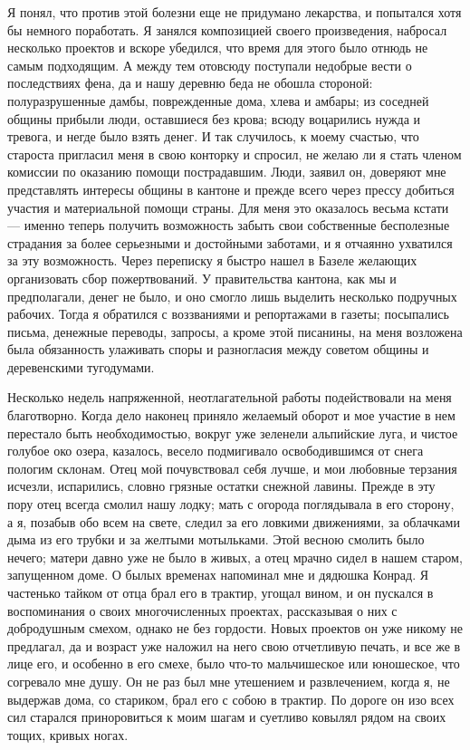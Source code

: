 Я  понял,  что против  этой  болезни  еще  не придумано  лекарства,  и
попытался  хотя бы  немного поработать.  Я занялся  композицией своего
произведения, набросал несколько проектов и вскоре убедился, что время
для  этого было  отнюдь  не  самым подходящим.  А  между тем  отовсюду
поступали недобрые вести  о последствиях фена, да и  нашу деревню беда
не обошла стороной: полуразрушенные  дамбы, поврежденные дома, хлева и
амбары; из соседней  общины прибыли люди, оставшиеся  без крова; всюду
воцарились нужда и тревога, и негде было взять денег. И так случилось,
к  моему  счастью, что  староста  пригласил  меня  в свою  конторку  и
спросил,  не желаю  ли  я  стать членом  комиссии  по оказанию  помощи
пострадавшим.  Люди, заявил  он,  доверяют  мне представлять  интересы
общины  в кантоне  и  прежде  всего через  прессу  добиться участия  и
материальной помощи страны.  Для меня это оказалось  весьма кстати ---
именно теперь получить возможность забыть свои собственные бесполезные
страдания  за более  серьезными и  достойными заботами,  и я  отчаянно
ухватился за эту возможность. Через  переписку я быстро нашел в Базеле
желающих организовать сбор пожертвований. У правительства кантона, как
мы и предполагали, денег не было, и оно смогло лишь выделить несколько
подручных рабочих.  Тогда я  обратился с  воззваниями и  репортажами в
газеты; посыпались  письма, денежные  переводы, запросы, а  кроме этой
писанины,  на  меня  возложена  была  обязанность  улаживать  споры  и
разногласия между советом общины и деревенскими тугодумами.

Несколько  недель  напряженной, неотлагательной  работы  подействовали
на  меня  благотворно.  Когда  дело наконец  приняло  желаемый  оборот
и  мое  участие  в  нем  перестало  быть  необходимостью,  вокруг  уже
зеленели  альпийские  луга,  и  чистое голубое  око  озера,  казалось,
весело подмигивало  освободившимся от снега пологим  склонам. Отец мой
почувствовал себя лучше, и  мои любовные терзания исчезли, испарились,
словно грязные остатки  снежной лавины. Прежде в эту  пору отец всегда
смолил нашу  лодку; мать  с огорода  поглядывала в  его сторону,  а я,
позабыв  обо всем  на  свете,  следил за  его  ловкими движениями,  за
облачками  дыма из  его трубки  и за  желтыми мотыльками.  Этой весною
смолить было нечего;  матери давно уже не было в  живых, а отец мрачно
сидел в нашем старом, запущенном  доме. О былых временах напоминал мне
и  дядюшка Конрад.  Я частенько  тайком от  отца брал  его в  трактир,
угощал  вином, и  он пускался  в воспоминания  о своих  многочисленных
проектах,  рассказывая  о них  с  добродушным  смехом, однако  не  без
гордости. Новых проектов он уже никому  не предлагал, да и возраст уже
наложил  на него  свою  отчетливую печать,  и  все же  в  лице его,  и
особенно  в его  смехе, было  что-то мальчишеское  или юношеское,  что
согревало мне душу. Он не раз  был мне утешением и развлечением, когда
я,  не выдержав  дома, со  стариком, брал  его с  собою в  трактир. По
дороге он изо всех сил старался  приноровиться к моим шагам и суетливо
ковылял рядом на своих тощих, кривых ногах.

